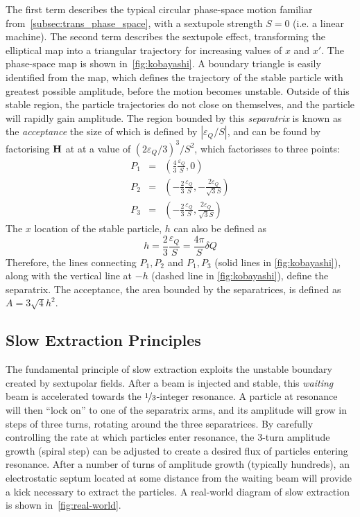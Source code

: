 \documentclass[11pt]{report}
\begin{document}
The first term describes the typical circular phase-space motion familiar from~\autoref{subsec:trans_phase_space}, with a sextupole strength $S=0$ (i.e. a linear machine). The second term describes the sextupole effect, transforming the elliptical map into a triangular trajectory for increasing values of $x$ and $x'$. The phase-space map is shown in~\autoref{fig:kobayashi}. A boundary triangle is easily identified from the map, which defines the trajectory of the stable particle with greatest possible amplitude, before the motion becomes unstable. Outside of this stable region, the particle trajectories do not close on themselves, and the particle will rapidly gain amplitude. The region bounded by this \textit{separatrix} is known as the \textit{acceptance} the size of which is defined by $|{\varepsilon_Q} /S|$, and can be found by factorising $\bf H$ at at a value of $(2{\varepsilon_Q} /3)^3/S^2$, which factorisses to three points:
\begin{eqnarray}
  P_1 &=& \left(\frac 43 \frac{\varepsilon_Q} S,    0                       \right) \\
  P_2 &=& \left(-\frac 23 \frac {\varepsilon_Q} S,  -\frac{2{\varepsilon_Q}}{\sqrt 3 S} \right) \\
  P_3 &=& \left(-\frac 23 \frac {\varepsilon_Q} S,  \frac{2{\varepsilon_Q}}{\sqrt 3 S} \right)
\end{eqnarray}
The $x$ location of the stable particle, $h$ can also be defined as
\begin{equation}
  h=\frac 23 \frac {\varepsilon_Q} S = \frac{4\pi}S\delta Q
  \label{eq:apothem}
\end{equation}
Therefore, the lines connecting $P_1, P_2$ and $P_1, P_3$ (solid lines in \autoref{fig:kobayashi}), along with the vertical line at $-h$ (dashed line in \autoref{fig:kobayashi}), define the separatrix. The acceptance, the area bounded by the separatrices, is defined as $A=3\sqrt 4 h^2$.

\subsection{Slow Extraction Principles}
The fundamental principle of slow extraction exploits the unstable boundary created by sextupolar fields. After a beam is injected and stable, this \textit{waiting} beam is accelerated towards the $\nicefrac 13$-integer resonance. A particle at resonance will then ``lock on'' to one of the separatrix arms, and its amplitude will grow in steps of three turns, rotating around the three separatrices. By carefully controlling the rate at which particles enter resonance, the 3-turn amplitude growth (spiral step) can be adjusted to create a desired flux of particles entering resonance. After a number of turns of amplitude growth (typically hundreds), an electrostatic septum located at some distance from the waiting beam will provide a kick necessary to extract the particles. A real-world diagram of slow extraction is shown in~\autoref{fig:real-world}.
\end{document}
